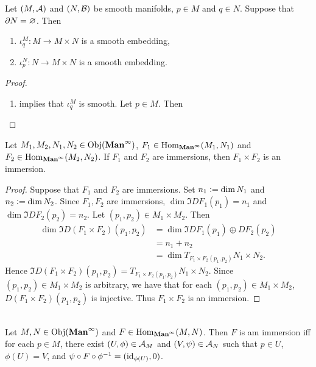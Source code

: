 \documentclass{book}
\begin{document}
	\begin{ex} 
		Let $(M, \mathcal{A})$ and $(N, \mathcal{B})$ be smooth manifolds, $p \in M$ and $q \in N$. Suppose that $\partial N = \varnothing$. Then 
		\begin{enumerate}
			\item $\iota^M_q: M \rightarrow M \times N$ is a smooth embedding,
			\item $\iota^N_p: N \rightarrow M \times N$ is a smooth embedding.
		\end{enumerate}
	\end{ex}

	\begin{proof}\
		\begin{enumerate}
			\item {} implies that $\iota_q^M$ is smooth. Let $p \in M$. Then 
		\end{enumerate}
	\end{proof}

\begin{ex}
	Let $M_1, M_2, N_1, N_2 \in \operatorname{Obj}(\operatorname*{\text{\textbf{Man}}^{\infty}})$, $F_1 \in \operatorname{Hom}_{\operatorname*{\text{\textbf{Man}}^{\infty}}}(M_1, N_1)$ and $F_2 \in \operatorname{Hom}_{\operatorname*{\text{\textbf{Man}}^{\infty}}}(M_2, N_2)$. If $F_1$ and $F_2$ are immersions, then $F_1 \times F_2$ is an immersion. 
\end{ex}

\begin{proof}
	Suppose that $F_1$ and $F_2$ are immersions. Set $n_1 \vcentcolon= \dim N_1$ and $n_2 \vcentcolon= \dim N_2$. Since $F_1, F_2$ are immersions, $\dim \Im DF_1(p_1) = n_1$ and $\dim \Im DF_2(p_2) = n_2$. Let $(p_1, p_2) \in M_1 \times M_2$. Then 
	\begin{align*}
		\dim \Im D(F_1 \times F_2)(p_1, p_2)
		& = \dim \Im DF_1(p_1) \oplus DF_2(p_2) \\
		& = n_1 + n_2 \\
		& = \dim T_{F_1 \times F_2(p_1, p_2)} N_1 \times N_2.
	\end{align*} 
	Hence $\Im D(F_1 \times F_2)(p_1, p_2) = T_{F_1 \times F_2(p_1, p_2)} N_1 \times N_2$. Since $(p_1, p_2) \in M_1 \times M_2$ is arbitrary, we have that for each $(p_1, p_2) \in M_1 \times M_2$, $D(F_1 \times F_2)(p_1, p_2)$ is injective. Thus $F_1 \times F_2$ is an immersion.
\end{proof}

\begin{ex}   \\
	Let $M,N \in \operatorname{Obj}(\operatorname*{\text{\textbf{Man}}^{\infty}})$ and $F \in \operatorname{Hom}_{\operatorname*{\text{\textbf{Man}}^{\infty}}}(M, N)$. Then $F$ is am immersion iff for each $p \in M$, there exist $(U, \phi) \in \mathcal{A}_M$ and $(V, \psi) \in \mathcal{A}_N$ such that $p \in U$, $\phi(U) = V$, and $\psi \circ F \circ \phi^{-1} = (\operatorname{id}_{\phi(U)}, 0)$.
\end{ex}
\end{document}

